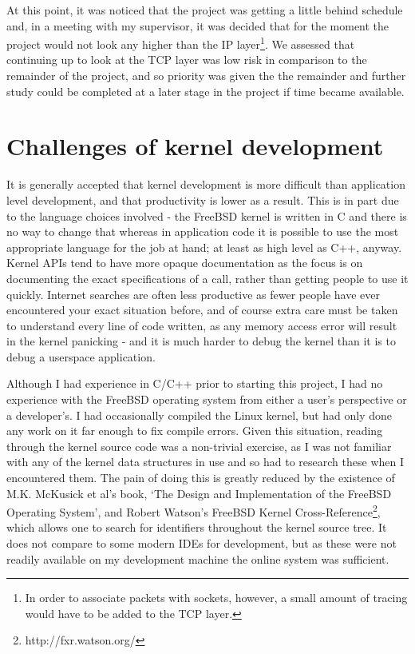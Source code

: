 \documentclass[a4paper,12pt,twoside,openright]{report}
\begin{document}
	At this point, it was noticed that the project was getting a little behind schedule and, in a meeting with my supervisor, it was decided that for the moment the project would not look any higher than the IP layer\footnote{In order to associate packets with sockets, however, a small amount of tracing would have to be added to the TCP layer.}. We assessed that continuing up to look at the TCP layer was low risk in comparison to the remainder of the project, and so priority was given the the remainder and further study could be completed at a later stage in the project if time became available.
	
	\section{Challenges of kernel development}
	
	It is generally accepted that kernel development is more difficult than application level development, and that productivity is lower as a result. This is in part due to the language choices involved - the FreeBSD kernel is written in C and there is no way to change that whereas in application code it is possible to use the most appropriate language for the job at hand; at least as high level as C++, anyway. Kernel APIs tend to have more opaque documentation as the focus is on documenting the exact specifications of a call, rather than getting people to use it quickly. Internet searches are often less productive as fewer people have ever encountered your exact situation before, and of course extra care must be taken to understand every line of code written, as any memory access error will result in the kernel panicking - and it is much harder to debug the kernel than it is to debug a userspace application.
	
	Although I had experience in C/C++ prior to starting this project, I had no experience with the FreeBSD operating system from either a user's perspective or a developer's. I had occasionally compiled the Linux kernel, but had only done any work on it far enough to fix compile errors. Given this situation, reading through the kernel source code was a non-trivial exercise, as I was not familiar with any of the kernel data structures in use and so had to research these when I encountered them. The pain of doing this is greatly reduced by the existence of M.K. McKusick et al's book, `The Design and Implementation of the FreeBSD Operating System'\cite{McKusick:2014:DIF:2659919}, and Robert Watson's FreeBSD Kernel Cross-Reference\footnote{http://fxr.watson.org/}, which allows one to search for identifiers throughout the kernel source tree. It does not compare to some modern IDEs for development, but as these were not readily available on my development machine the online system was sufficient.
	
\end{document}
